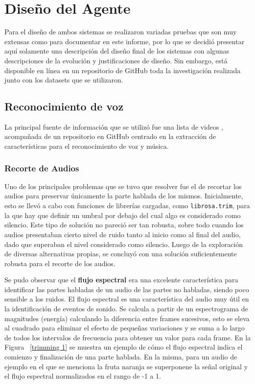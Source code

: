 \documentclass[a4paper, 12pt]{article}
\begin{document}
\section{Diseño del Agente}
Para el diseño de ambos sistemas se realizaron variadas pruebas que son muy extensas como para documentar en este informe, por lo que se decidió presentar aquí solamente una descripción del diseño final de los sistemas con algunas descripciones de la evolución y justificaciones de diseño. Sin embargo, está disponible en línea en un repositorio de GitHub \cite{cita_repositorio_github} toda la investigación realizada junto con los datasets que se utilizaron.
\subsection{Reconocimiento de voz}
La principal fuente de información que se utilizó fue una lista de videos \cite{cita_videos}, acompañada de un repositorio en GitHub \cite{cita_repositorio} centrado en la extracción de características para el reconocimiento de voz y música.
\subsubsection{Recorte de Audios}
Uno de los principales problemas que se tuvo que resolver fue el de recortar los audios para preservar únicamente la parte hablada de los mismos. Inicialmente, esto se llevó a cabo con funciones de librerías cargadas, como \texttt{librosa.trim}, para la que hay que definir un umbral por debajo del cual algo es considerado como silencio. Este tipo de solución no pareció ser tan robusta, sobre todo cuando los audios presentaban cierto nivel de ruido tanto al inicio como al final del audio, dado que superaban el nivel considerado como silencio. Luego de la exploración de diversas alternativas propias, se concluyó con una solución suficientemente robusta para el recorte de los audios.

Se pudo observar que el \textbf{flujo espectral} era una excelente característica para identificar las partes habladas de un audio de las partes no habladas, siendo poco sensible a los ruidos. El flujo espectral es una característica del audio muy útil en la identificación de eventos de sonido. Se calcula a partir de un espectrograma de magnitudes (energía) calculando la diferencia entre frames sucesivos, esto se eleva al cuadrado para eliminar el efecto de pequeñas variaciones y se suma a lo largo de todos los intervalos de frecuencia para obtener un valor para cada frame.
En la Figura ~\ref{trimming 1} se muestra un ejemplo de cómo el flujo espectral indica el comienzo y finalización de una parte hablada. En la misma, para un audio de ejemplo en el que se menciona la fruta naranja se superponene la señal original y el flujo espectral normalizados en el rango de -1 a 1.
\end{document}
